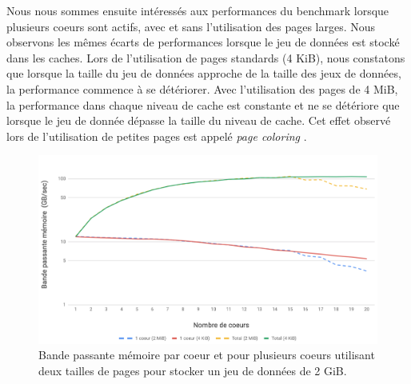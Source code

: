     \begin{table}[]
    \centering
    \caption{Performance du benchmark \texttt{DML\_MEM} utilisant deux tailles de pages. La performance dans les 4 niveaux de la hiérarchie mémoire a été mesurée avec le benchmark et le nombre d'évènements \textit{miss} lorsque le jeu de donnée est dans le cache L3.}
    \label{tab:large_page_memory}
    \end{table}
    
    
    Nous nous sommes ensuite intéressés aux performances du benchmark lorsque plusieurs coeurs sont actifs, avec et sans l'utilisation des pages larges. Nous observons les mêmes écarts de performances lorsque le jeu de données est stocké dans les caches. Lors de l'utilisation de pages standards (4 KiB), nous constatons que lorsque la taille du jeu de données approche de la taille des jeux de données, la performance commence à se détériorer. Avec l'utilisation des pages de 4 MiB, la performance dans chaque niveau de cache est constante et ne se détériore que lorsque le jeu de donnée dépasse la taille du niveau de cache. Cet effet observé lors de l'utilisation de petites pages est appelé \textit{page coloring} \cite{Zhang2009}.
  
    \begin{figure}
    \center
    \includegraphics[width=14cm]{images/dml_large_page_bw.png}
    \caption{\label{pic:dml_large_page_bw} Bande passante mémoire par coeur et pour plusieurs coeurs utilisant deux tailles de pages pour stocker un jeu de données de 2 GiB.}
    \end{figure}
    
